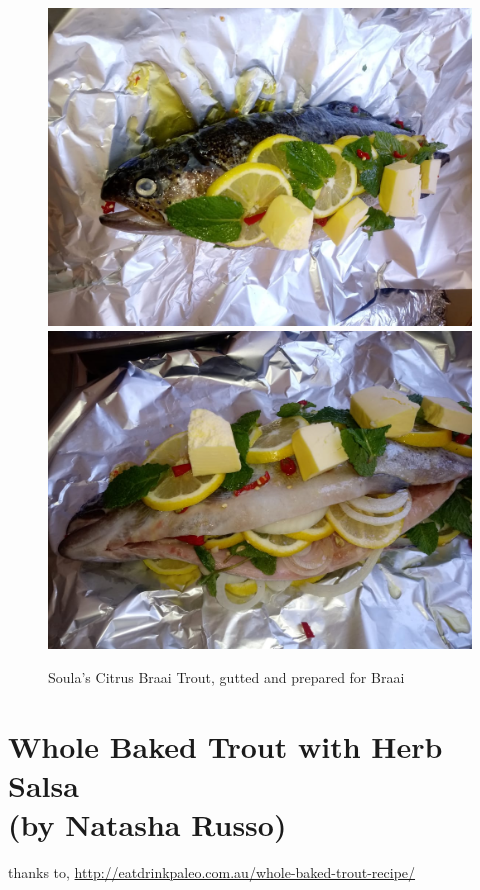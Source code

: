 \begin{figure}[H]
    \includegraphics[scale=0.15]{recipes/soula_2.jpg} \hspace{0.2cm}   \includegraphics[scale=0.15]{recipes/soula_5.jpg} 
   \caption{Soula's Citrus Braai Trout, gutted and prepared for Braai}
  \label{fig:SoulaBraaiTrout}
\end{figure}  

\newpage
\section{Whole Baked Trout with Herb Salsa \\ (by Natasha Russo)} 

thanks to,  \url{http://eatdrinkpaleo.com.au/whole-baked-trout-recipe/}

